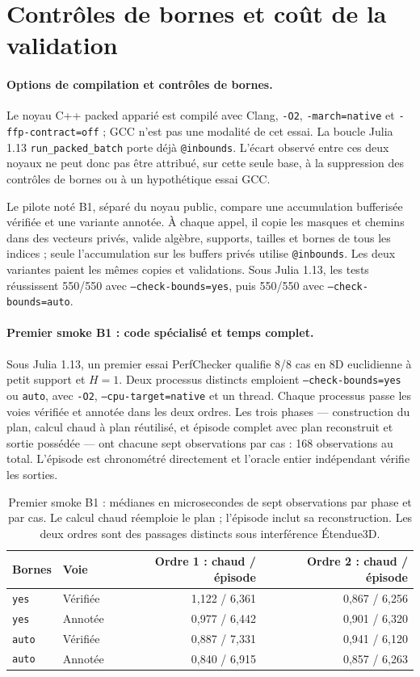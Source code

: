 \documentclass[11pt,a4paper]{article}
\newcommand{\code}[1]{\texttt{#1}}
\begin{document}
\section{Contrôles de bornes et coût de la validation}
\paragraph{Options de compilation et contrôles de bornes.}
Le noyau C++ packed apparié est compilé avec Clang, \code{-O2},
\code{-march=native} et \code{-ffp-contract=off} ; GCC n'est pas une
modalité de cet essai. La boucle Julia 1.13 \code{run\_packed\_batch} porte déjà
\code{@inbounds}. L'écart observé entre ces deux noyaux ne peut donc
pas être attribué, sur cette seule base, à la suppression des contrôles
de bornes ou à un hypothétique essai GCC.

Le pilote noté B1, séparé du noyau public,
compare une accumulation bufferisée vérifiée et une variante annotée.
À chaque appel, il copie les masques et chemins dans des vecteurs privés,
valide algèbre, supports, tailles et bornes de tous les indices ; seule
l'accumulation sur les buffers privés utilise \code{@inbounds}. Les deux
variantes paient les mêmes copies et validations. Sous Julia 1.13, les
tests réussissent 550/550 avec \code{--check-bounds=yes}, puis 550/550
avec \code{--check-bounds=auto}.

\paragraph{Premier smoke B1 : code spécialisé et temps complet.}
Sous Julia 1.13, un premier essai PerfChecker qualifie 8/8 cas en 8D
euclidienne à petit support et $H=1$. Deux processus distincts emploient
\code{--check-bounds=yes} ou \code{auto}, avec \code{-O2},
\code{--cpu-target=native} et un thread. Chaque processus passe les voies
vérifiée et annotée dans les deux ordres. Les trois phases --- construction
du plan, calcul chaud à plan réutilisé, et épisode complet avec plan
reconstruit et sortie possédée --- ont chacune sept observations par cas :
168 observations au total. L'épisode est chronométré directement et
l'oracle entier indépendant vérifie les sorties.

\begin{table}[ht]
\centering\small
\begin{tabular}{@{}llrr@{}}
\toprule
Bornes & Voie & Ordre 1 : chaud / épisode & Ordre 2 : chaud / épisode \\
\midrule
\code{yes} & Vérifiée & 1,122 / 6,361 & 0,867 / 6,256 \\
\code{yes} & Annotée & 0,977 / 6,442 & 0,901 / 6,320 \\
\code{auto} & Vérifiée & 0,887 / 7,331 & 0,941 / 6,120 \\
\code{auto} & Annotée & 0,840 / 6,915 & 0,857 / 6,263 \\
\bottomrule
\end{tabular}
\caption{Premier smoke B1 : médianes en microsecondes de sept
observations par phase et par cas. Le calcul chaud réemploie le plan ;
l'épisode inclut sa reconstruction. Les deux ordres sont des passages
distincts sous interférence Étendue3D.}
\label{tab:b1smoke}
\end{table}
\end{document}
